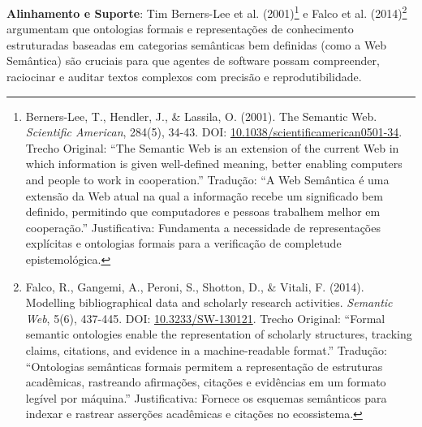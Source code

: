\documentclass[12pt,a4paper,oneside]{abntex2}
\begin{document}
\textbf{Alinhamento e Suporte}: Tim Berners-Lee et al. (2001)\footnote{Berners-Lee, T., Hendler, J., \& Lassila, O. (2001). The Semantic Web. \textit{Scientific American}, 284(5), 34-43. DOI: \href{https://doi.org/10.1038/scientificamerican0501-34}{10.1038/scientificamerican0501-34}. Trecho Original: ``The Semantic Web is an extension of the current Web in which information is given well-defined meaning, better enabling computers and people to work in cooperation.'' Tradução: ``A Web Semântica é uma extensão da Web atual na qual a informação recebe um significado bem definido, permitindo que computadores e pessoas trabalhem melhor em cooperação.'' Justificativa: Fundamenta a necessidade de representações explícitas e ontologias formais para a verificação de completude epistemológica.} e Falco et al. (2014)\footnote{Falco, R., Gangemi, A., Peroni, S., Shotton, D., \& Vitali, F. (2014). Modelling bibliographical data and scholarly research activities. \textit{Semantic Web}, 5(6), 437-445. DOI: \href{https://doi.org/10.3233/SW-130121}{10.3233/SW-130121}. Trecho Original: ``Formal semantic ontologies enable the representation of scholarly structures, tracking claims, citations, and evidence in a machine-readable format.'' Tradução: ``Ontologias semânticas formais permitem a representação de estruturas acadêmicas, rastreando afirmações, citações e evidências em um formato legível por máquina.'' Justificativa: Fornece os esquemas semânticos para indexar e rastrear asserções acadêmicas e citações no ecossistema.} argumentam que ontologias formais e representações de conhecimento estruturadas baseadas em categorias semânticas bem definidas (como a Web Semântica) são cruciais para que agentes de software possam compreender, raciocinar e auditar textos complexos com precisão e reprodutibilidade.
\end{document}

